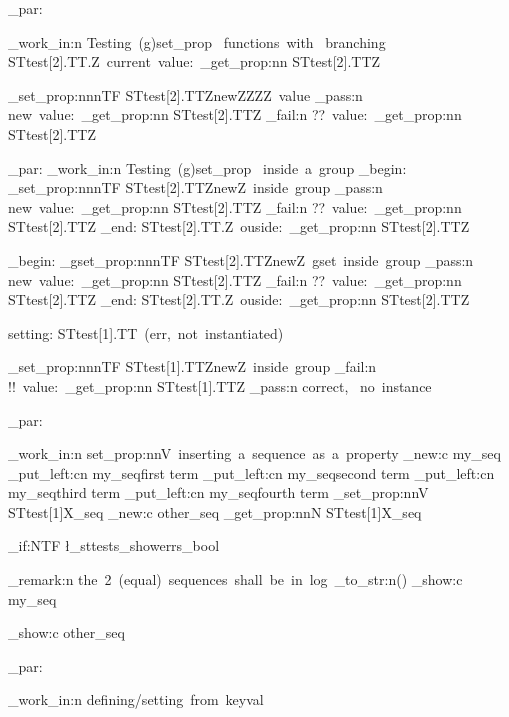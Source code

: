 \documentclass{article}
\begin{document}
\sttests_par:

\sttests_work_in:n {Testing~(g)set_prop ~functions~with ~branching}
STtest[2].TT.Z~current~value:~\starray_get_prop:nn {STtest[2].TT}{Z}\par

\starray_set_prop:nnnTF {STtest[2].TT}{Z}{newZZZZ~value}
  {\sttests_pass:n {new~value:~\starray_get_prop:nn {STtest[2].TT}{Z}}}
  {\sttests_fail:n {??~value:~\starray_get_prop:nn {STtest[2].TT}{Z}}}

\sttests_par:
\sttests_work_in:n {Testing~(g)set_prop ~inside~a~group}
\group_begin:
  \starray_set_prop:nnnTF {STtest[2].TT}{Z}{newZ~inside~group}
    {\sttests_pass:n {new~value:~\starray_get_prop:nn {STtest[2].TT}{Z}}}
    {\sttests_fail:n {??~value:~\starray_get_prop:nn {STtest[2].TT}{Z}}}
\group_end:
  STtest[2].TT.Z~ouside:~\starray_get_prop:nn {STtest[2].TT}{Z}\par

\group_begin:
  \starray_gset_prop:nnnTF {STtest[2].TT}{Z}{newZ~gset~inside~group}
    {\sttests_pass:n {new~value:~\starray_get_prop:nn {STtest[2].TT}{Z}}}
    {\sttests_fail:n {??~value:~\starray_get_prop:nn {STtest[2].TT}{Z}}}
\group_end:
  STtest[2].TT.Z~ouside:~\starray_get_prop:nn {STtest[2].TT}{Z}\par

setting: STtest[1].TT~(err,~not~instantiated)\par
  \starray_set_prop:nnnTF {STtest[1].TT}{Z}{newZ~inside~group}
    {\sttests_fail:n {!!~value:~\starray_get_prop:nn {STtest[1].TT}{Z}}}
    {\sttests_pass:n {correct, ~no~instance}}


\sttests_par:

\sttests_work_in:n {set_prop:nnV~inserting~a~sequence~as~a~property}
        \seq_new:c {my_seq}
        \seq_put_left:cn {my_seq}{first term}
        \seq_put_left:cn {my_seq}{second term}
        \seq_put_left:cn {my_seq}{third term}
        \seq_put_left:cn {my_seq}{fourth term}
        \starray_set_prop:nnV {STtest[1]}{X}{\my_seq}
        \seq_new:c {other_seq}
        \starray_get_prop:nnN {STtest[1]}{X}\other_seq

\bool_if:NTF \l_sttests_showerrs_bool
  {
    \sttests_remark:n {the~2~(equal)~sequences~shall~be~in~log~\tl_to_str:n{(\show)}}
   \seq_show:c {my_seq}

   \seq_show:c {other_seq}
  }
  {
  }


\sttests_par:

\sttests_work_in:n {defining/setting~from~keyval}
\end{document}
